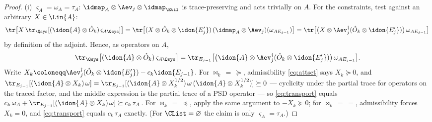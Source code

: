 \begin{proof}
(i) $\varsigma_A=\omega_A=\tau_A$:
$\idmap_A\otimes\Aev_j\otimes\idmap_{\Etil}$ is trace-preserving and
acts trivially on $A$. For the constraints, test against an arbitrary
$X\in\Lin{A}$:
\begin{equation*}
  \tr\big[X\,\tr_{\Qsys}[(\idon{A}\otimes\hat O_k)\,
  \varsigma_{A\Qsys}]\big]
  =\tr\big[(X\otimes\hat O_k\otimes\idon{E'_j})\,
  (\idmap_A\otimes\Aev_j)(\omega_{AE_{j-1}})\big]
  =\tr\big[\big(X\otimes
  \Aev_j^{\dagger}(\hat O_k\otimes\idon{E'_j})\big)\,
  \omega_{AE_{j-1}}\big]
\end{equation*}
by definition of the adjoint. Hence, as operators on $A$,
\begin{equation}\label{eq:transport}
  \tr_{\Qsys}\big[(\idon{A}\otimes\hat O_k)\,\varsigma_{A\Qsys}\big]
  =\tr_{E_{j-1}}\big[\big(\idon{A}\otimes
  \Aev_j^{\dagger}(\hat O_k\otimes\idon{E'_j})\big)\,
  \omega_{AE_{j-1}}\big].
\end{equation}
Write $X_k\coloneqq\Aev_j^{\dagger}(\hat O_k\otimes\idon{E'_j})
-c_k\idon{E_{j-1}}$. For $\bowtie_k\,=\,\succeq$, admissibility
\eqref{eq:attset} says $X_k\succeq0$, and
$\tr_{E_{j-1}}[(\idon{A}\otimes X_k)\,\omega]
=\tr_{E_{j-1}}[(\idon{A}\otimes X_k^{1/2})\,\omega\,
(\idon{A}\otimes X_k^{1/2})]\succeq0$ --- cyclicity under the partial
trace for operators on the traced factor, and the middle expression is
the partial trace of a PSD operator --- so \eqref{eq:transport} equals
$c_k\,\omega_A+\tr_{E_{j-1}}[(\idon{A}\otimes X_k)\,\omega]
\succeq c_k\,\tau_A$. For $\bowtie_k\,=\,\preceq$, apply the same
argument to $-X_k\succeq0$; for $\bowtie_k\,=\,=$, admissibility
forces $X_k=0$, and \eqref{eq:transport} equals $c_k\,\tau_A$ exactly.
(For $\CList=\varnothing$ the claim is only $\varsigma_A=\tau_A$.)


\end{proof}
